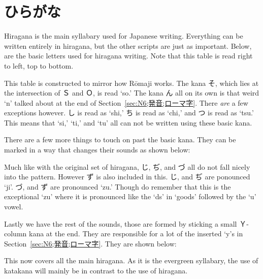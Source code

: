 \section[ひらがな]{ひらがな}\label{sec:N6;かな;ひらがな}

Hiragana is the main syllabary used for Japanese writing. Everything can be written entirely in hiragana, but the other scripts are just as important. Below, are the basic letters used for hiragana writing. Note that this table is read right to left, top to bottom.



This table is constructed to mirror how R\=omaji works. The kana そ, which lies at the intersection of Ｓ and Ｏ, is read `so.' The kana ん all on its own is that weird `n' talked about at the end of Section~\ref{sec:N6;発音;ローマ字}. There \textit{are} a few exceptions however. し is read as `shi,' ち is read as `chi,' and つ is read as `tsu.' This means that `si,' `ti,' and `tu' all can not be written using these basic kana.

There are a few more things to touch on past the basic kana. They can be marked in a way that changes their sounds as shown below:



Much like with the original set of hiragana, じ, ぢ, and づ all do not fall nicely into the pattern. However ず is also included in this. じ, and ぢ are ponounced `ji'. づ, and ず are pronounced `zu.' Though do remember that this is the exceptional `zu' where it is pronounced like the `ds' in `goods' followed by the `u' vowel.

Lastly we have the rest of the sounds, those are formed by sticking a small Ｙ-column kana at the end. They are responsible for a lot of the inserted `y's in Section~\ref{sec:N6;発音;ローマ字}. They are shown below:



This now covers all the main hiragana. As it is the evergreen syllabary, the use of katakana will mainly be in contrast to the use of hiragana.
